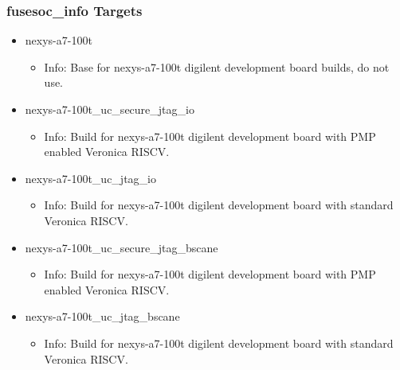 \subsubsection{fusesoc\_info Targets}
\begin{itemize}
\item nexys-a7-100t
	\begin{itemize}
	\item[$\space$] Info: Base for nexys-a7-100t digilent development board builds, do not use.
	\end{itemize}
\item nexys-a7-100t\_uc\_secure\_jtag\_io
	\begin{itemize}
	\item[$\space$] Info: Build for nexys-a7-100t digilent development board with PMP enabled Veronica RISCV.
	\end{itemize}
\item nexys-a7-100t\_uc\_jtag\_io
	\begin{itemize}
	\item[$\space$] Info: Build for nexys-a7-100t digilent development board with standard Veronica RISCV.
	\end{itemize}
\item nexys-a7-100t\_uc\_secure\_jtag\_bscane
	\begin{itemize}
	\item[$\space$] Info: Build for nexys-a7-100t digilent development board with PMP enabled Veronica RISCV.
	\end{itemize}
\item nexys-a7-100t\_uc\_jtag\_bscane
	\begin{itemize}
	\item[$\space$] Info: Build for nexys-a7-100t digilent development board with standard Veronica RISCV.
	\end{itemize}
\end{itemize}
